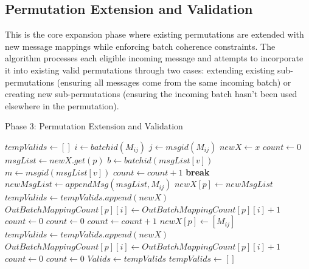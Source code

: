 \documentclass{article}
\begin{document}
\subsection{Permutation Extension and Validation}

This is the core expansion phase where existing 
permutations are extended with new message 
mappings while enforcing batch coherence 
constraints. The algorithm processes each 
eligible incoming message and attempts to 
incorporate it into existing valid permutations 
through two cases: extending existing 
sub-permutations (ensuring all messages 
come from the same incoming batch) or 
creating new sub-permutations (ensuring 
the incoming batch hasn't been used elsewhere 
in the permutation).


\begin{algorithm}[H]
\caption*{Phase 3: Permutation Extension and Validation}
\begin{algorithmic}[1]
    \State $tempValids \gets []$
        \State $ i \gets batchid(M_{ij}) $
        \State $ j \gets msgid(M_{ij}) $
            \State $ newX \gets x $
            \State $count \gets 0$
            \State $ msgList \gets newX.get(p) $
                \State {}
                    \State $ b \gets batchid(msgList[v]) $
                    \State $ m \gets msgid(msgList[v]) $
                        \State $count \gets count + 1$
                    \Else
                        \State \textbf{break}
                    \EndIf
                \EndFor
                    \State $ newMsgList \gets appendMsg( msgList,M_{ij})$
                    \State $newX[p] \gets newMsgList $
                    \State $tempValids \gets tempValids.append(newX)$
                    \State $ OutBatchMappingCount[p][i] \gets OutBatchMappingCount[p][i] + 1$
                    \State $count \gets 0$
                \Else
                    \State $count \gets 0$
                \EndIf
            \Else
                \State {}
                        \State $count \gets count + 1$
                    \EndIf
                \EndFor
                    \State $newX [p] \gets  [M_{ij}] $
                    \State $ tempValids \gets tempValids.append(newX) $
                    \State $ OutBatchMappingCount[p][i] \gets OutBatchMappingCount[p][i] + 1 $
                    \State $count \gets 0$
                \Else
                    \State $count \gets 0$
                \EndIf
            \EndIf
        \EndFor
    \EndFor
    \State $ Valids \gets tempValids $
    \State $ tempValids \gets [] $
\EndIf
\end{algorithmic}
\end{algorithm}
\end{document}

